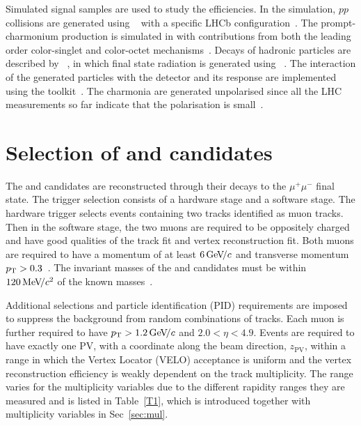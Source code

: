 \documentclass[12pt,a4paper]{article}
\begin{document}
Simulated signal samples are used to study the efficiencies. In the simulation, $pp$ collisions are generated using \pythia~\cite{Sjostrand:2006za} with a specific LHCb configuration~\cite{LHCb:2011dpk}. The prompt-charmonium production is simulated in \pythia with contributions from both the leading order color-singlet and color-octet mechanisms~\cite{LHCb:2011dpk,Bargiotti:2007zz}. Decays of hadronic particles are described by \evtgen~\cite{Lange:2001uf}, in which final state radiation is generated using \photos~\cite{Golonka:2005pn}. The interaction of the generated particles with the detector and its response are implemented using the \geant toolkit~\cite{GEANT4:2002zbu,Clemencic:2011zza}.  The charmonia are generated unpolarised since all the LHC measurements so far indicate that the polarisation is small~\cite{LHCb-PAPER-2013-008,LHCb-PAPER-2013-067}.


\section{Selection of \boldmath{\jpsi} and \boldmath{\psitwos} candidates}
\label{Candidate Reconstruction and selection}

The \jpsi and \psitwos candidates are reconstructed through their decays to the $\mu^+\mu^-$ final state.
The trigger selection consists of a hardware stage and a software stage. The hardware trigger selects events containing two tracks identified as muon tracks. Then in the software stage, the two muons are required to be oppositely charged and have good qualities of the track fit and vertex reconstruction fit. Both muons are required to have a momentum of at least $6 \text{\,Ge\kern -0.1em V\!/}c$ and transverse momentum $p_{\mathrm{T}} > 0.3$~\gevc. The invariant masses of the \jpsi and \psitwos candidates must be within $120 \text{\,Me\kern -0.1em V\!/}c^2 $ of the known  masses~\cite{Workman:2022ynf}. 

Additional selections and particle identification (PID) requirements are imposed to suppress the background from random combinations of tracks. Each muon is further required to have $p_{\mathrm{T}}>1.2\text{\,Ge\kern -0.1em V\!/}c$ and $2.0<\eta<4.9$. Events are required to have exactly one PV, with a coordinate along the beam direction, $z_{\mathrm{PV}}$, within a range in which the Vertex Locator (VELO) acceptance is uniform and the vertex reconstruction efficiency is weakly dependent on the track multiplicity. The range varies for the multiplicity variables due to the different rapidity ranges they are measured and is listed in Table~\ref{T1}, which is introduced together with multiplicity variables in Sec~\ref{sec:mul}. 
\end{document}
